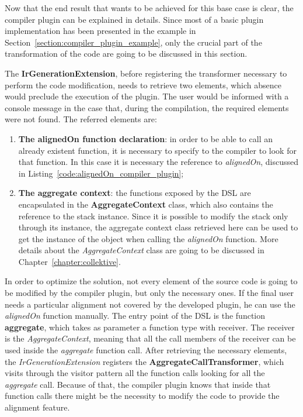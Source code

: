Now that the end result that wants to be achieved for this base case is clear, the compiler plugin can be explained in details.\newline
Since most of a basic plugin implementation has been presented in the example in Section~\ref{section:compiler_plugin_example}, only the crucial part of the transformation of the code are going to be discussed in this section.

The \textbf{IrGenerationExtension}, before registering the transformer necessary to perform the code modification, needs to retrieve two elements, which absence would preclude the execution of the plugin. The user would be informed with a console message in the case that, during the compilation, the required elements were not found.\newline
The referred elements are:
\begin{enumerate}
    \item \textbf{The alignedOn function declaration}: in order to be able to call an already existent function, it is necessary to specify to the compiler to look for that function. In this case it is necessary the reference to \textit{alignedOn}, discussed in Listing~\ref{code:alignedOn_compiler_plugin};
    \item \textbf{The aggregate context}: the functions exposed by the DSL are encapsulated in the \textbf{AggregateContext} class, which also contains the reference to the stack instance. Since it is possible to modify the stack only through its instance, the aggregate context class retrieved here can be used to get the instance of the object when calling the \textit{alignedOn} function. More details about the \textit{AggregateContext} class are going to be discussed in Chapter~\ref{chapter:collektive}.
\end{enumerate}

In order to optimize the solution, not every element of the source code is going to be modified by the compiler plugin, but only the necessary ones. If the final user needs a particular alignment not covered by the developed plugin, he can use the \textit{alignedOn} function manually.\newline
The entry point of the DSL is the function \textbf{aggregate}, which takes as parameter a function type with receiver. The receiver is the \textit{AggregateContext}, meaning that all the call members of the receiver can be used inside the \textit{aggregate} function call.\newline
After retrieving the necessary elements, the \textit{IrGenerationExtension} registers the \textbf{AggregateCallTransformer}, which visits through the visitor pattern all the function calls looking for all the \textit{aggregate} call. Because of that, the compiler plugin knows that inside that function calls there might be the necessity to modify the code to provide the alignment feature.

